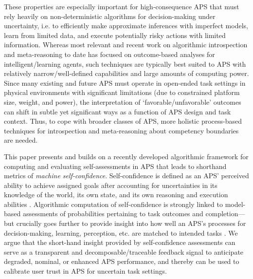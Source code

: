 These properties are especially important for high-consequence APS that must rely heavily on non-deterministic algorithms for decision-making under uncertainty, i.e. to efficiently make approximate inferences with imperfect models, learn from limited data, and execute potentially risky actions with limited information. 
Whereas most relevant and recent work on algorithmic introspection and meta-reasoning to date has focused on outcome-based analyses for intelligent/learning agents, such techniques are typically best suited to APS with relatively narrow/well-defined capabilities and large amounts of computing power. Since many existing and future APS must operate in open-ended task settings in physical environments with significant limitations (due to constrained platform size, weight, and power), the interpretation of `favorable/unfavorable' outcomes can shift in subtle yet significant ways as a function of APS design and task context. Thus, to cope with broader classes of APS, %
more holistic process-based techniques for introspection and meta-reasoning about competency boundaries are needed. 

This paper presents and builds on a recently developed algorithmic framework for computing and evaluating self-assessments in APS that leads to shorthand metrics of \emph{machine self-confidence}. Self-confidence is defined as an APS' perceived ability to achieve assigned goals after accounting for uncertainties in its knowledge of the world, its own state, and its own reasoning and execution abilities \cite{Aitken2016-cv, Aitken2016-fb, Sweet2016-tz}. 
Algorithmic computation of self-confidence is strongly linked to model-based assessments of probabilities pertaining to task outcomes and completion---but crucially goes further to provide insight into how well an APS's processes for decision-making, learning, perception, etc. are matched to intended tasks \cite{Hutchins2015-if}. 
We argue that the short-hand insight provided by self-confidence assessments can serve as a transparent and decomposable/traceable feedback signal to anticipate degraded, nominal, or enhanced APS performance, %
and thereby can be used to calibrate user trust in APS for uncertain task settings. 


